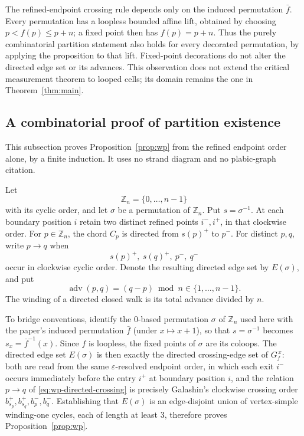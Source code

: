 \documentclass[11pt]{article}
\theoremstyle{definition}
\newcommand{\ba}{\bar f}
\begin{document}
The refined-endpoint crossing rule depends only on the induced permutation
$\ba$. Every permutation has a
loopless bounded affine lift, obtained by choosing $p<f(p)\le p+n$; a fixed
point then has $f(p)=p+n$. Thus the purely combinatorial partition statement
also holds for every decorated permutation, by applying the proposition to
that lift. Fixed-point decorations do not alter the directed edge set or its
advances. This observation does not extend the critical measurement theorem
to looped cells; its domain remains the one in Theorem~\ref{thm:main}.


\subsection{A combinatorial proof of partition existence}
\label{sec:wp-combinatorial-bridge}


This subsection proves Proposition~\ref{prop:wp} from the refined endpoint order
alone, by a finite induction. It uses no strand diagram and no plabic-graph citation.

Let
\[
   \mathbb Z_n=\{0,\ldots,n-1\}
\]
with its cyclic order, and let \(\sigma\) be a permutation of
\(\mathbb Z_n\). Put \(s=\sigma^{-1}\). At each boundary position \(i\)
retain two distinct refined points \(i^-,i^+\), in that clockwise order.
For \(p\in\mathbb Z_n\), the chord \(C_p\) is directed from \(s(p)^+\) to
\(p^-\). For distinct \(p,q\), write \(p\to q\) when
\begin{equation}
   s(p)^+,\ s(q)^+,\ p^-,\ q^-
   \label{eq:wp-directed-crossing}
\end{equation}
occur in clockwise cyclic order. Denote the resulting directed edge set by
\(E(\sigma)\), and put
\[
   \operatorname{adv}(p,q)=(q-p)\bmod n\in\{1,\ldots,n-1\}.
\]
The winding of a directed closed walk is its total advance divided by \(n\).

To bridge conventions, identify the \(0\)-based permutation \(\sigma\) of
\(\mathbb Z_n\) used here with the paper's induced permutation \(\ba\) (under
\(x\mapsto x+1\)), so that \(s=\sigma^{-1}\) becomes \(s_x=\ba^{-1}(x)\). Since
\(f\) is loopless, the fixed points of \(\sigma\) are its coloops.  The
directed edge set \(E(\sigma)\) is then exactly the directed crossing-edge set of
\(G_f^{\,x}\): both are read from the same \(\varepsilon\)-resolved endpoint order,
in which each exit \(i^-\) occurs immediately before the entry \(i^+\) at boundary
position \(i\), and the relation \(p\to q\) of \eqref{eq:wp-directed-crossing}
is precisely Galashin's clockwise crossing order
\(b^+_{s_p},b^+_{s_q},b^-_p,b^-_q\).  Establishing that \(E(\sigma)\) is an
edge-disjoint union of vertex-simple winding-one cycles, each of length at least
\(3\), therefore proves Proposition~\ref{prop:wp}.
\end{document}
